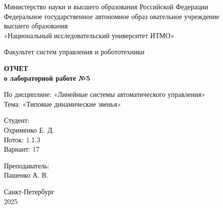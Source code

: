 \documentclass[a4paper,12pt]{article}
\begin{document}
	
	\begin{titlepage}
		\centering
		\vspace*{1cm}
		
		{\small
			Министерство науки и высшего образования Российской Федерации\\
			Федеральное государственное автономное образ			овательное учреждение\\
			высшего образования\\
			«Национальный исследовательский университет ИТМО»\\
		}
		
		\vspace{2cm}
		
		{\large
			Факультет систем управления и робототехники\\
		}
		
		\vspace{3cm}
		
		{\Huge\bfseries
			ОТЧЕТ\\
		}
		\vspace{0.5cm}
		{\LARGE\bfseries
			о лабораторной работе №5\\
		}
		
		\vspace{1cm}
		
		{\Large
			По дисциплине: «Линейные системы автоматического управления»\\
			\vspace{0.5cm}
			Тема: «Типовые динамические звенья»\\
		}
		
		\vspace{3cm}
		
		\begin{minipage}{0.4\textwidth}
			\raggedright
			{\large
				Студент:\\
			}
			Охрименко Е. Д.\\
			Поток: 1.1.3\\
			Вариант: 17\\
		\end{minipage}
		\hfill
		\begin{minipage}{0.4\textwidth}
			\raggedleft
			{\large
				Преподаватель:\\
			}
			Пашенко А. В.\\
		\end{minipage}
		
		\vfill
		
		{\large
			Санкт-Петербург\\
			2025\\
		}
		
	\end{titlepage}
	
\end{document}
